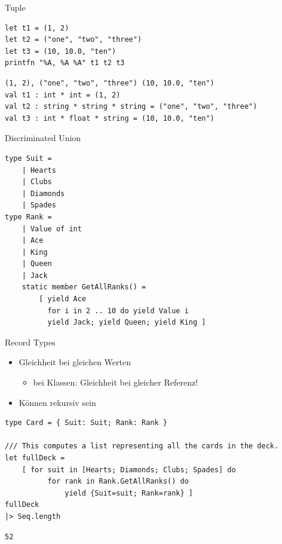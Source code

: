 \documentclass[t]{beamer}
\begin{document}
\begin{frame}[label={sec:org0887957},fragile]{Tuple}
 \begin{verbatim}
let t1 = (1, 2)
let t2 = ("one", "two", "three")
let t3 = (10, 10.0, "ten")
printfn "%A, %A %A" t1 t2 t3
\end{verbatim}

\begin{verbatim}
(1, 2), ("one", "two", "three") (10, 10.0, "ten")
val t1 : int * int = (1, 2)
val t2 : string * string * string = ("one", "two", "three")
val t3 : int * float * string = (10, 10.0, "ten")
\end{verbatim}
\end{frame}

\begin{frame}[label={sec:orgccb30b3},fragile]{Discriminated Union}
 \begin{verbatim}
type Suit = 
    | Hearts 
    | Clubs 
    | Diamonds 
    | Spades
type Rank = 
    | Value of int
    | Ace
    | King
    | Queen
    | Jack
    static member GetAllRanks() = 
        [ yield Ace
          for i in 2 .. 10 do yield Value i
          yield Jack; yield Queen; yield King ]
\end{verbatim}
\end{frame}

\begin{frame}[label={sec:org8441fff},fragile]{Record Types}
 \begin{itemize}
\item Gleichheit bei gleichen Werten 
\begin{itemize}
\item bei Klassen: Gleichheit bei gleicher Referenz!
\end{itemize}
\item Können rekursiv sein
\end{itemize}

\begin{verbatim}
type Card = { Suit: Suit; Rank: Rank }

/// This computes a list representing all the cards in the deck.
let fullDeck = 
    [ for suit in [Hearts; Diamonds; Clubs; Spades] do
          for rank in Rank.GetAllRanks() do 
              yield {Suit=suit; Rank=rank} ]
fullDeck 
|> Seq.length
\end{verbatim}

\begin{verbatim}
52
\end{verbatim}
\end{frame}
\end{document}
